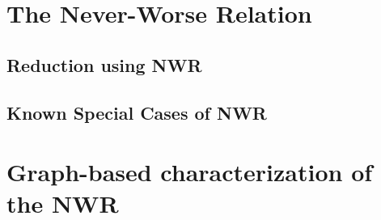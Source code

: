\section{The Never-Worse Relation}
\label{sec:topic}

\subsection{Reduction using NWR}
\label{subsec:Reduction using NWR}

\subsection{Known Special Cases of NWR}
\label{subsec:Known special cases of NWR}

\section{Graph-based characterization of the NWR}
\label{subsec:Graph-based characterization of the NWR}